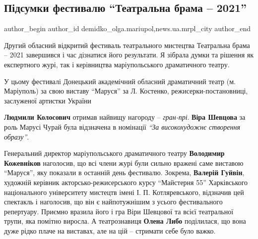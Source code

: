  
 
 
 
 
 
\subsection{Підсумки фестивалю \enquote{Театральна брама – 2021}}
\label{sec:21_09_2021.stz.news.ua.mrpl_city.1.pidsumky_brama_2021}
 
\ifcmt
 author_begin
   author_id demidko_olga.mariupol,news.ua.mrpl_city
 author_end
\fi

Другий обласний відкритий фестиваль театрального мистецтва Театральна брама –
2021 завершився і час дізнатися його результати. Я зібрала думки та рішення як
експертного журі, так і керівництва маріупольського драматичного театру.


У цьому фестивалі Донецький академічний обласний драматичний театр (м. Маріуполь)
за свою виставу \enquote{Маруся} за Л. Костенко, режисерки-постановниці, заслуженої
артистки України\par\noindent\textbf{Людмили Колосович} отримав найвищу нагороду – \emph{гран-прі}. \textbf{Віра
Шевцова} за роль Марусі Чурай була відзначена в номінації \emph{\enquote{За високохудожнє
створення образу}}.


Генеральний директор маріупольського драматичного театру \textbf{Володимир Кожевніков}
наголосив,  що всі члени журі були сильно вражені саме виставою \enquote{Маруся}, яку
показали в останній день фестивалю. Зокрема, \textbf{Валерій Гуйвін}, художній керівник
акторсько-режисерського курсу \enquote{Майстерня 55} Харківського національного
університету мистецтв імені І. П. Котляревського, відзначив цей спектакль і
наголосив, що він є найпотужнішим з усього фестивального репертуару. Приємно
вразила його і гра Віри Шевцової та всієї театральної трупи, яка помітно
виросла. А театрознавиця \textbf{Олена Либо} поділилася, що вона дуже рідко плаче на
виставах, але на цій – стримати себе було важко.

